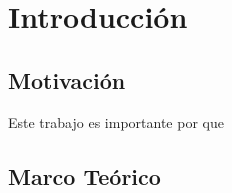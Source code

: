 \chapter{Introducción}






\section{Motivación}

Este trabajo es importante por que 



\section{Marco Teórico}

